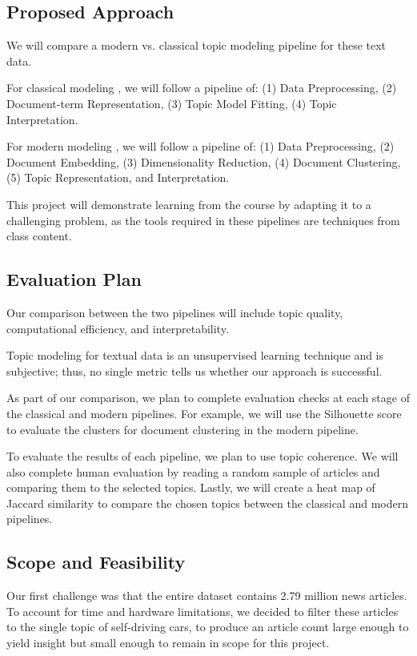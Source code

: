 \documentclass{article}
\begin{document}
\subsection*{Proposed Approach}

We will compare a modern vs. classical topic modeling pipeline for these text data. 

For classical modeling \parencite{qamar2024}, we will follow a pipeline of: (1) Data Preprocessing, (2) Document-term Representation, (3) Topic Model Fitting, (4) Topic Interpretation.

For modern modeling \parencite{alammar2024, kumari2026}, we will follow a pipeline of: (1) Data Preprocessing, (2) Document Embedding, (3) Dimensionality Reduction, (4) Document Clustering, (5) Topic Representation, and Interpretation.

This project will demonstrate learning from the course by adapting it to a challenging problem, as the tools required in these pipelines are techniques from class content.

\subsection*{Evaluation Plan}  

Our comparison between the two pipelines will include topic quality, computational efficiency, and interpretability.

Topic modeling for textual data is an unsupervised learning technique and is subjective; thus, no single metric tells us whether our approach is successful.

As part of our comparison, we plan to complete evaluation checks at each stage of the classical and modern pipelines. For example, we will use the Silhouette score to evaluate the clusters for document clustering in the modern pipeline.

To evaluate the results of each pipeline, we plan to use topic coherence. We will also complete human evaluation by reading a random sample of articles and comparing them to the selected topics. Lastly, we will create a heat map of Jaccard similarity to compare the chosen topics between the classical and modern pipelines. 


\subsection*{Scope and Feasibility}
Our first challenge was that the entire dataset contains 2.79 million news articles. To account for time and hardware limitations, we decided to filter these articles to the single topic of self-driving cars, to produce an article count large enough to yield insight but small enough to remain in scope for this project. 
\end{document}
